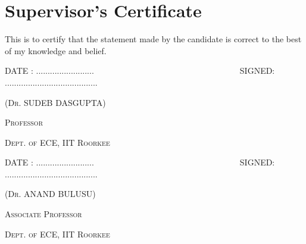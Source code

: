 %
%
%
%
%
%
\chapter*{Supervisor's Certificate}
\begin{OnehalfSpacing}
This is to certify that the statement made by the candidate is correct to the best of my knowledge and belief.

\vspace{2.25cm}


\noindent
\textsc{DATE : .........................~~~~~~~~~~~~~~~~~~~~~~~~~~~~~~~~~~~SIGNED: ........................................}

\nobreak
\hfill \textsc{(Dr. SUDEB DASGUPTA)}

\vspace{-4 mm}
\nobreak
\hfill \textsc{Professor}

\vspace{-4 mm}
\nobreak
\hfill \textsc{Dept. of ECE, IIT Roorkee}

\vspace{1.25cm}
\noindent
\textsc{DATE : .........................~~~~~~~~~~~~~~~~~~~~~~~~~~~~~~~~~~~SIGNED: ........................................}

\nobreak
\hfill \textsc{(Dr. ANAND BULUSU)}

\vspace{-4 mm}
\nobreak
\hfill \textsc{Associate Professor}

\vspace{-4 mm}
\nobreak
\hfill \textsc{Dept. of ECE, IIT Roorkee}

\end{OnehalfSpacing}
\clearpage 